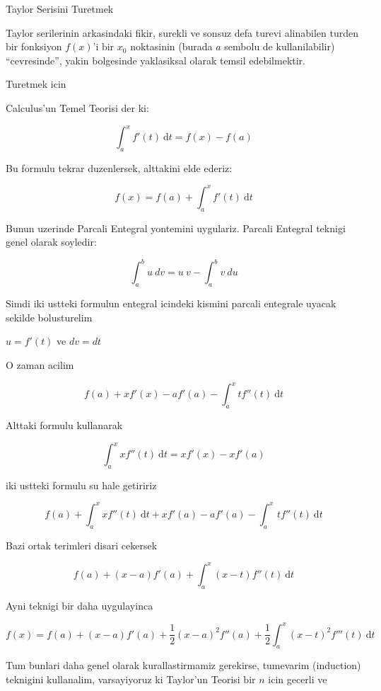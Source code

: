 \documentclass[12pt,fleqn]{article}
\begin{document}
Taylor Serisini Turetmek 

Taylor serilerinin arkasindaki fikir, surekli ve sonsuz defa turevi
alinabilen turden bir fonksiyon $f(x)$'i bir $x_0$ noktasinin (burada $a$
sembolu de kullanilabilir) ``cevresinde'', yakin bolgesinde yaklasiksal
olarak temsil edebilmektir.

Turetmek icin

Calculus'un Temel Teorisi der ki:

\[ \int_a^x f' \left({t}\right) \ \mathrm d t = 
f \left({x}\right) - f \left({a} \right)
\]

Bu formulu tekrar duzenlersek, alttakini elde ederiz:

\[ f \left({x}\right) = f \left({a}\right) + \int_a^x f'(t) \ \mathrm d t \]

Bunun uzerinde Parcali Entegral yontemini uygulariz. Parcali Entegral
teknigi genel olarak soyledir:

\[ \int_a^b u \ dv = u \ v - \int_a^b v \ du \]

Simdi iki ustteki formulun entegral icindeki kismini parcali entegrale
uyacak sekilde bolusturelim

$u = f' \left({t}\right)$ ve $dv = dt$

O zaman acilim

\[ f \left({a}\right) + x f' \left({x}\right) - a f' \left({a}\right) - \int_a^x t f'' \left({t}\right) \ \mathrm d t \]

Alttaki formulu kullanarak

\[ \int_a^x x f'' \left({t}\right) \ \mathrm d t = x f' (x)-x f' (a) \]

iki ustteki formulu su hale getiririz

\[ f \left({a}\right) + \int_a^x x f'' \left({t}\right) \ \mathrm d t + x f' \left({a}\right) - a f' \left({a}\right)-\int_a^x \, t f'' \left({t}\right) \ \mathrm d t \]

Bazi ortak terimleri disari cekersek

\[ f \left({a}\right) + (x-a) f' \left({a}\right) + \int_a^x (x-t) f'' \left({t}\right) \ \mathrm d t \]

Ayni teknigi bir daha uygulayinca

\[ f \left({x}\right) = f \left({a}\right)+(x-a) f' \left({a}\right)+ \frac 1 2 (x-a)^2f'' \left({a}\right) + \frac 1 2 \int_a^x (x-t)^2 f''' \left({t}\right) \ \mathrm d t\]

Tum bunlari daha genel olarak kurallastirmamiz gerekirse, tumevarim
(induction) teknigini kullanalim, varsayiyoruz ki Taylor'un Teorisi bir $n$
icin gecerli ve
\end{document}
